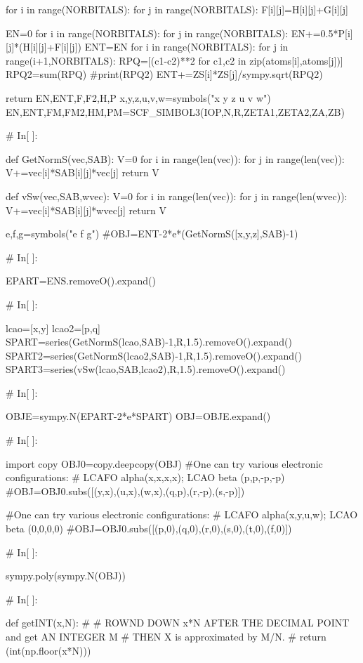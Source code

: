     for i in range(NORBITALS):
        for j in range(NORBITALS):
            F[i][j]=H[i][j]+G[i][j]

    EN=0
    for i in range(NORBITALS):
        for j in range(NORBITALS):
            EN+=0.5*P[i][j]*(H[i][j]+F[i][j])
    ENT=EN
    for i in range(NORBITALS):
        for j in range(i+1,NORBITALS):
            RPQ=[(c1-c2)**2 for c1,c2 in zip(atoms[i],atoms[j])]
            RPQ2=sum(RPQ)
            #print(RPQ2)
            ENT+=ZS[i]*ZS[j]/sympy.sqrt(RPQ2)
            


    return EN,ENT,F,F2,H,P
x,y,z,u,v,w=symbols("x y z u v w")
EN,ENT,FM,FM2,HM,PM=SCF_SIMBOL3(IOP,N,R,ZETA1,ZETA2,ZA,ZB)


# In[ ]:


def GetNormS(vec,SAB):
    V=0
    for i in range(len(vec)):
        for j in range(len(vec)):
            V+=vec[i]*SAB[i][j]*vec[j]
    return V

def vSw(vec,SAB,wvec):
    V=0
    for i in range(len(vec)):
        for j in range(len(wvec)):
            V+=vec[i]*SAB[i][j]*wvec[j]
    return V

e,f,g=symbols("e f g")
#OBJ=ENT-2*e*(GetNormS([x,y,z],SAB)-1)


# In[ ]:


EPART=ENS.removeO().expand()


# In[ ]:


lcao=[x,y]
lcao2=[p,q]
SPART=series(GetNormS(lcao,SAB)-1,R,1.5).removeO().expand()
SPART2=series(GetNormS(lcao2,SAB)-1,R,1.5).removeO().expand()
SPART3=series(vSw(lcao,SAB,lcao2),R,1.5).removeO().expand()


# In[ ]:


OBJE=sympy.N(EPART-2*e*SPART)
OBJ=OBJE.expand()


# In[ ]:


import copy
OBJ0=copy.deepcopy(OBJ)
#One can try various electronic configurations:
# LCAFO alpha(x,x,x,x); LCAO beta (p,p,-p,-p)
#OBJ=OBJ0.subs([(y,x),(u,x),(w,x),(q,p),(r,-p),(s,-p)])

#One can try various electronic configurations:
# LCAFO alpha(x,y,u,w); LCAO beta (0,0,0,0)
#OBJ=OBJ0.subs([(p,0),(q,0),(r,0),(s,0),(t,0),(f,0)])


# In[ ]:


sympy.poly(sympy.N(OBJ))


# In[ ]:


def getINT(x,N):
#
#  ROWND DOWN x*N AFTER THE DECIMAL POINT and get AN INTEGER M
#  THEN X is approximated by M/N. 
#
    return (int(np.floor(x*N)))

